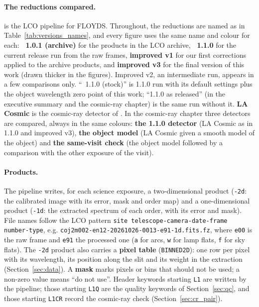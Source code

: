 \paragraph{The reductions compared.} \banzai{} is the LCO pipeline for FLOYDS. Throughout, the reductions are named as
in Table~\ref{tab:versions_names}, and every figure uses the same name and colour for each:
\textcolor[HTML]{8a8a85}{\textbf{\banzai{}~1.0.1 (archive)}} for the products in the LCO archive,
\textcolor[HTML]{2a6fb0}{\textbf{\banzai{}~1.1.0}} for the current release run from the raw frames,
\textcolor[HTML]{d9822b}{\textbf{improved v1}} for our first corrections applied to the archive products, and
\textcolor[HTML]{8e44ad}{\textbf{improved v3}} for the final version of this work (drawn thicker in the figures).
Improved v2, an intermediate run, appears in a few comparisons only. ``\banzai{}~1.1.0 (stock)'' is 1.1.0 run with
its default settings plus the object wavelength zero point of this work; ``1.1.0 as released'' (in the executive summary and the cosmic-ray chapter)
is the same run without it. \textbf{LA Cosmic} is the cosmic-ray detector of \banzai{} \citep{vanDokkum2001}. In the cosmic-ray chapter
three detectors are compared, always in the same colours: \textcolor[HTML]{2a6fb0}{\textbf{the 1.1.0 detector}}
(LA Cosmic as in 1.1.0 and improved v3), \textcolor[HTML]{8e44ad}{\textbf{the object model}} (LA Cosmic given a
smooth model of the object) and \textcolor[HTML]{1b7f79}{\textbf{the same-visit check}} (the object model followed
by a comparison with the other exposure of the visit).

\paragraph{Products.} The pipeline writes, for each science exposure, a two-dimensional product (\texttt{-2d}: the
calibrated image with its error, mask and order map) and a one-dimensional product (\texttt{-1d}: the extracted
spectrum of each order, with its error and mask). File names follow the LCO pattern
\texttt{site telescope-camera-date-frame number-type}, e.g. \texttt{coj2m002-en12-20261026-0013-e91-1d.fits.fz}, where
\texttt{e00} is the raw frame and \texttt{e91} the processed one (\texttt{a} for arcs, \texttt{w} for lamp flats,
\texttt{f} for sky flats). The \texttt{-2d} product also carries a \textbf{pixel table} (\texttt{BINNED2D}): one row
per pixel with its wavelength, its position along the slit and its weight in the extraction (Section~\ref{sec:data}). A \textbf{mask} marks pixels or bins that should not
be used; a non-zero value means ``do not use''. Header keywords starting \texttt{L1} are written by the pipeline;
those starting \texttt{L1Q} are the quality keywords of Section~\ref{sec:qc}, and those starting \texttt{L1CR}
record the cosmic-ray check (Section~\ref{sec:cr_pair}).

